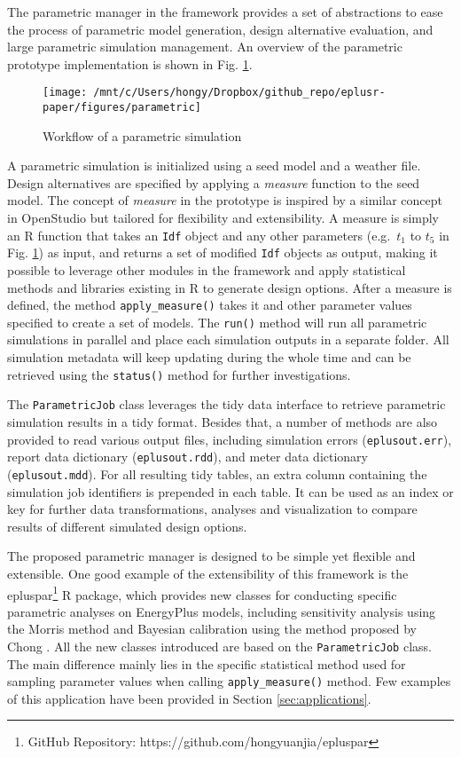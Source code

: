 \documentclass[3p, times]{elsarticle} %
\begin{document}
The parametric manager in the framework provides a set of abstractions to
ease the process of parametric model generation, design alternative evaluation,
and large parametric simulation management. An overview of the parametric
prototype implementation is shown in Fig. \ref{fig:parametric}.

\begin{figure}[!htb]
\texttt{[image: /mnt/c/Users/hongy/Dropbox/github\_repo/eplusr-paper/figures/parametric]} \caption{Workflow of a parametric simulation}\label{fig:parametric}
\end{figure}

A parametric simulation is initialized using a seed model and a weather file.
Design alternatives are specified by applying a \emph{measure} function to the seed
model. The concept of \emph{measure} in the prototype is inspired by a similar concept
in OpenStudio \citep{Guglielmetti2011} but tailored for flexibility and
extensibility.
A measure is simply an R function that takes an \texttt{Idf} object and any other
parameters (e.g.~\(t_1\) to \(t_5\) in Fig. \ref{fig:parametric}) as input, and
returns a set of modified \texttt{Idf} objects as output, making it possible to
leverage other modules in the framework and apply statistical methods and
libraries existing in R to generate design options.
After a measure is defined, the method \texttt{apply\_measure()} takes it and other
parameter values specified to create a set of models.
The \texttt{run()} method will run all parametric simulations in parallel and place
each simulation outputs in a separate folder.
All simulation metadata will keep updating during the whole time and can be
retrieved using the \texttt{status()} method for further investigations.

The \texttt{ParametricJob} class leverages the tidy data interface to retrieve
parametric simulation results in a tidy format.
Besides that, a number of methods are also provided to read various output
files, including simulation errors (\texttt{eplusout.err}), report data dictionary
(\texttt{eplusout.rdd}), and meter data dictionary (\texttt{eplusout.mdd}).
For all resulting tidy tables, an extra column containing the simulation job
identifiers is prepended in each table. It can be used as an index or key for
further data transformations, analyses and visualization to compare results of
different simulated design options.

The proposed parametric manager is designed to be simple yet flexible and
extensible.
One good example of the extensibility of this framework is the epluspar\footnote{GitHub
  Repository: https://github.com/hongyuanjia/epluspar} R package, which provides
new classes for conducting specific parametric analyses on EnergyPlus models,
including sensitivity analysis using the Morris method \citep{Morris1991} and
Bayesian calibration using the method proposed by Chong \citep{Chong2017}.
All the new classes introduced are based on the \texttt{ParametricJob} class.
The main difference mainly lies in the specific statistical method used for
sampling parameter values when calling \texttt{apply\_measure()} method.
Few examples of this application have been provided in Section
\ref{sec:applications}.
\end{document}
